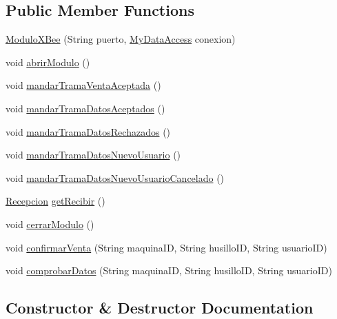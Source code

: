 \subsection*{Public Member Functions}
\begin{DoxyCompactItemize}
\item 
\mbox{\hyperlink{classcomunicacion_1_1_modulo_x_bee_aaea76284c0f4a44f4223888c9a8b44ea}{Modulo\+X\+Bee}} (String puerto, \mbox{\hyperlink{classconexion_s_q_l_1_1_my_data_access}{My\+Data\+Access}} conexion)
\item 
void \mbox{\hyperlink{classcomunicacion_1_1_modulo_x_bee_a2d5ad79e8571f3a2daaf66e3b5df4351}{abrir\+Modulo}} ()
\item 
void \mbox{\hyperlink{classcomunicacion_1_1_modulo_x_bee_a71bbc67392676c9e0bd57813a87d06c0}{mandar\+Trama\+Venta\+Aceptada}} ()
\item 
void \mbox{\hyperlink{classcomunicacion_1_1_modulo_x_bee_a60d0556ad61da3b8f66d192779c70bd7}{mandar\+Trama\+Datos\+Aceptados}} ()
\item 
void \mbox{\hyperlink{classcomunicacion_1_1_modulo_x_bee_ac996e20c06c0e1c33f868e33d13f083b}{mandar\+Trama\+Datos\+Rechazados}} ()
\item 
void \mbox{\hyperlink{classcomunicacion_1_1_modulo_x_bee_aecb573d973ba1e5e24a2c2cc5d1541f6}{mandar\+Trama\+Datos\+Nuevo\+Usuario}} ()
\item 
void \mbox{\hyperlink{classcomunicacion_1_1_modulo_x_bee_a965cdd2756d507c8c80eade0bf34d06e}{mandar\+Trama\+Datos\+Nuevo\+Usuario\+Cancelado}} ()
\item 
\mbox{\hyperlink{classcomunicacion_1_1_recepcion}{Recepcion}} \mbox{\hyperlink{classcomunicacion_1_1_modulo_x_bee_aa5c08aaaafb7b4dcb11fecb4fb47812f}{get\+Recibir}} ()
\item 
void \mbox{\hyperlink{classcomunicacion_1_1_modulo_x_bee_a4691476e52e74492bd9d9bc6919f0c4a}{cerrar\+Modulo}} ()
\item 
void \mbox{\hyperlink{classcomunicacion_1_1_modulo_x_bee_a34debd695cc102e385156983a52a658c}{confirmar\+Venta}} (String maquina\+ID, String husillo\+ID, String usuario\+ID)
\item 
void \mbox{\hyperlink{classcomunicacion_1_1_modulo_x_bee_aa9794310e90df8198dbcfc8aacaa1405}{comprobar\+Datos}} (String maquina\+ID, String husillo\+ID, String usuario\+ID)
\end{DoxyCompactItemize}


\subsection{Constructor \& Destructor Documentation}
\mbox{\label{classcomunicacion_1_1_modulo_x_bee_aaea76284c0f4a44f4223888c9a8b44ea}} 
